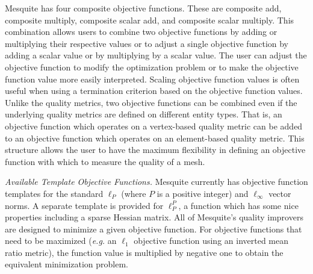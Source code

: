 \documentclass[psfig]{article}
\begin{document}

Mesquite has four composite objective functions.  These are
composite add, composite multiply, composite scalar add, and
composite scalar multiply.  This combination allows users
to combine two objective functions by adding or multiplying
their respective values or to adjust a single objective function
by adding a scalar value or by multiplying by a scalar value.  
The user can adjust the objective function to modify the
optimization problem or to make the objective function value
more easily interpreted.  Scaling objective function values
is often useful when using a termination criterion based on the
objective function values. Unlike the quality metrics, 
two objective functions can be combined
even if the underlying quality metrics are defined on different entity
types.  That is, an objective function which operates on a vertex-based
quality metric can be added to an objective function which operates
on an element-based quality metric.  This structure allows the user
to have the maximum flexibility in defining an objective function with
which to measure the quality of a mesh.


{\it Available Template Objective Functions.}  Mesquite currently has objective
function templates for the standard $\ell_{P}$ (where $P$ is a
positive integer) and $\ell_{\infty}$ vector norms.  A separate
template is provided for $\ell_{P}^{P}$, a function which has some
nice properties including a sparse Hessian matrix.  All of Mesquite's
quality improvers are designed to minimize a given objective function.
For objective functions that need to be maximized ({\it e.g.} an
$\ell_{1}$ objective function using an inverted mean ratio metric),
the function value is multiplied by negative one to obtain the
equivalent minimization problem.
\end{document}
